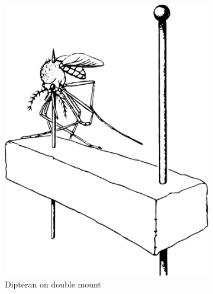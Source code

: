 \begin{figure}[ht!]
    \centering
    \begin{subfigure}[ht!]{0.32\textwidth}
        \includegraphics[width=\textwidth]{sections/img/specimenPreps/doublemount}
        \caption{Dipteran on double mount \citep[modified from][Fig. 18A]{USDAmanual1986}}
        \label{fig:flymount}
    \end{subfigure}
    \qquad
    \begin{subfigure}[ht!]{0.36\textwidth}

\end{subfigure}
\end{figure}
